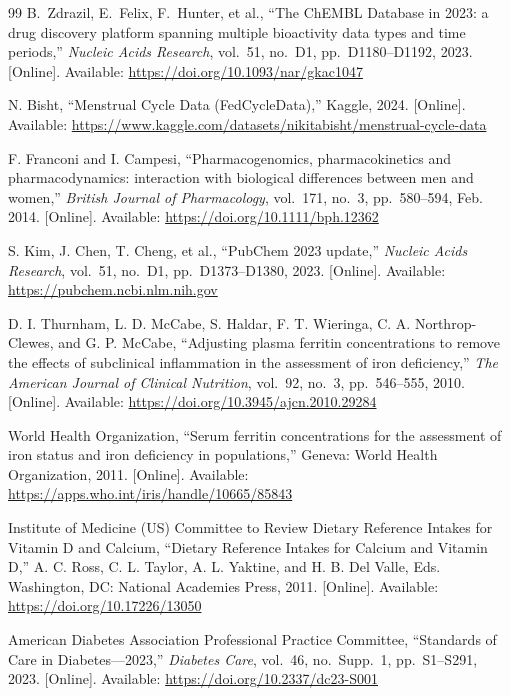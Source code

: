 \begin{thebibliography}{99}
B.~Zdrazil, E.~Felix, F.~Hunter, et al.,
``The ChEMBL Database in 2023: a drug discovery platform spanning multiple bioactivity data types and time periods,''
\textit{Nucleic Acids Research}, vol.~51, no.~D1, pp.~D1180--D1192, 2023.
[Online]. Available: \url{https://doi.org/10.1093/nar/gkac1047}

N. Bisht,
``Menstrual Cycle Data (FedCycleData),''
Kaggle, 2024.
[Online]. Available: \url{https://www.kaggle.com/datasets/nikitabisht/menstrual-cycle-data}

F. Franconi and I. Campesi,
``Pharmacogenomics, pharmacokinetics and pharmacodynamics: interaction with biological differences between men and women,''
\textit{British Journal of Pharmacology}, vol.~171, no.~3, pp.~580--594, Feb. 2014.
[Online]. Available: \url{https://doi.org/10.1111/bph.12362}

S. Kim, J. Chen, T. Cheng, et al.,
``PubChem 2023 update,''
\textit{Nucleic Acids Research}, vol.~51, no.~D1, pp.~D1373--D1380, 2023.
[Online]. Available: \url{https://pubchem.ncbi.nlm.nih.gov}

D. I. Thurnham, L. D. McCabe, S. Haldar, F. T. Wieringa, C. A. Northrop-Clewes, and G. P. McCabe,
``Adjusting plasma ferritin concentrations to remove the effects of subclinical inflammation in the assessment of iron deficiency,''
\textit{The American Journal of Clinical Nutrition}, vol.~92, no.~3, pp.~546--555, 2010.
[Online]. Available: \url{https://doi.org/10.3945/ajcn.2010.29284}

World Health Organization,
``Serum ferritin concentrations for the assessment of iron status and iron deficiency in populations,''
Geneva: World Health Organization, 2011.
[Online]. Available: \url{https://apps.who.int/iris/handle/10665/85843}

Institute of Medicine (US) Committee to Review Dietary Reference Intakes for Vitamin D and Calcium,
``Dietary Reference Intakes for Calcium and Vitamin D,''
A. C. Ross, C. L. Taylor, A. L. Yaktine, and H. B. Del Valle, Eds.
Washington, DC: National Academies Press, 2011.
[Online]. Available: \url{https://doi.org/10.17226/13050}

American Diabetes Association Professional Practice Committee,
``Standards of Care in Diabetes---2023,''
\textit{Diabetes Care}, vol.~46, no.~Supp.~1, pp.~S1--S291, 2023.
[Online]. Available: \url{https://doi.org/10.2337/dc23-S001}


\end{thebibliography}
